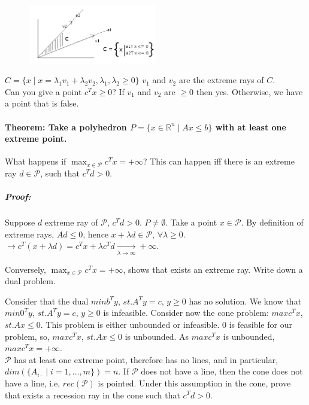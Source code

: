 \documentclass[main]{subfiles}
\begin{document}
\begin{figure}[!h]
  \label{fig:cone}
  \centering
    \includegraphics[width=0.5\textwidth]{imgs/cone.png}
\end{figure}

$C = \{x \mid x =\lambda_1 v_1 + \lambda_2 v_2, \lambda_1, \lambda_2 \geq 0 \}$
$v_1$ and $v_2$ are the extreme rays of $C$.\\
Can you give a point $c^T x \geq 0$? If $v_1$ and $v_2$ are $\geq 0$ then yes.
Otherwise, we have a point that is false.

\paragraph{Theorem: Take a polyhedron $P = \{x \in \mathbb{R}^n \mid Ax \leq b
\}$ with at least one extreme point.} What happens if $\displaystyle \max_{x
\in \mathcal{P}} c^{T} x = +\infty$? This can happen iff there is an extreme
ray $d \in \mathcal{P}$, such that $c^T d > 0$.

\subparagraph{Proof:}
Suppose $d$ extreme ray of $\mathcal{P}$, $c^T d > 0$. $P \neq \emptyset$. Take
a point $x \in \mathcal{P}$. By definition of extreme rays, $Ad \leq 0$, hence
$x + \lambda d \in \mathcal{P}$, $\forall \lambda \geq 0$.\\
$\rightarrow c^T(x +\lambda d) = c^T x + \lambda c^T d \xrightarrow[\lambda \to
\infty]{} +\infty$.

Conversely, $\displaystyle \max_{x \in \mathcal{P}} c^{T} x = +\infty$, shows 
that exists an extreme ray. Write down a dual problem.

Consider that the dual $min b^T y$, $st. A^T y = c$, $y \geq 0$ has no
solution. We know that $min 0^T y$, $st. A^T y = c$, $y \geq 0$ is infeasible.
Consider now the cone problem: $max c^T x$, $st. Ax \leq 0$. This problem is
either unbounded or infeasible. $0$ is feasible for our problem, so,
$max c^T x$, $st. Ax \leq 0$ is unbounded. As $max c^T x$ is unbounded,
$max c^T x = +\infty$.\\

$\mathcal{P}$ has at least one extreme point, therefore has no lines, and in
particular, $dim(\{A_{i\cdot} \mid i = 1, \dots, m\}) = n$. If $\mathcal{P}$
does not have a line, then the cone does not have a line, i.e,
$rec(\mathcal{P})$ is pointed.
Under this assumption in the cone, prove that exists a recession ray in the
cone such that $c^T d > 0$.
\end{document}
